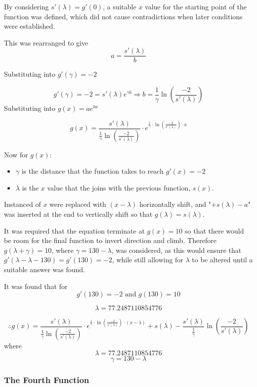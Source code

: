 \documentclass[10pt, letterpaper]{article}
\begin{document}
	

By considering $s'(\lambda)=g'(0)$, a suitable $x$ value for the starting point of the function was defined, which did not cause contradictions when later conditions were established. 

This was rearranged to give $$a=\frac{s'(\lambda)}{b}$$

Substituting into $g'(\gamma)=-2$
 
 $$g'(\gamma)=-2=s'(\lambda)e^{\gamma b}\Rightarrow 
 b=\frac{1}{\gamma}\ln(\frac{-2}{s'(\lambda)})$$ Substituting into $g(x)=ae^{bx}$

 $$g(x)=\frac{s'(\lambda)}{\frac{1}{\gamma}\ln(\frac{-2}{s'(\lambda)})}\cdot e^{\frac{1}{\gamma}\cdot \ln (\frac{-2}{s'(\lambda)})\cdot x}$$ 
 
 Now for $g(x)$:
 \begin{itemize}
 	\item $\gamma$ is the distance that the function takes to reach $g'(x)=-2$
 	\item $\lambda$ is the $x$ value that the joins with the previous function, $s(x)$.
 \end{itemize}
		

Instanced of $x$ were replaced with $(x-\lambda)$ horizontally shift, and "$+s(\lambda)-a$" was inserted at the end to vertically shift so that $g(\lambda)=s(\lambda)$.
		

It was required that the equation terminate at $g(x)=10$ so that there would be room for the final function to invert direction and climb. Therefore $g(\lambda + \gamma)=10$, where $\gamma=130-\lambda$, was considered, as this would ensure that $g'(\lambda-\lambda-130)=g'(130)=-2$, while still allowing for $\lambda$ to be altered until a suitable answer was found.
		

It was found that for 
$$g'(130)=-2 \textrm{ and } g(130)=10$$ 

$$\lambda=77.2487110854776$$ 

$$\therefore g(x)=\frac{s'(\lambda)}{\frac{1}{\gamma}\ln(\frac{-2}{s'(\lambda)})}\cdot e^{\frac{1}{\gamma}\cdot \ln (\frac{-2}{s'(\lambda)})\cdot (x-\lambda)}+s\left(\lambda\right)-\frac{s'(\lambda)}{\frac{1}{\gamma}}\ln\left(\frac{-2}{s'\left(\lambda\right)}\right)$$ where $$\lambda=77.2487110854776$$
$$\gamma=130-\lambda$$





\subsubsection{The Fourth Function}
\end{document}

